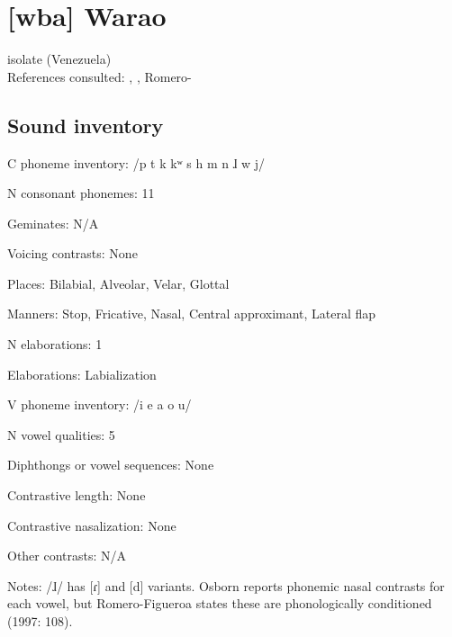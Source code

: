 {\section*{[wba] Warao} %
isolate (Venezuela)\medskip\\
References consulted: \citet{Arinterol2000}, \citet{Osborn1966}, Romero-\citet{Figeroa1997}

\subsection*{Sound inventory}
\begin{appendixdesc}

\item[C phoneme inventory:] /p t k kʷ s h m n ɺ w j/

\item[N consonant phonemes:] 11

\item[Geminates:] N/A

\item[Voicing contrasts:] None

\item[Places:] Bilabial, Alveolar, Velar, Glottal

\item[Manners:] Stop, Fricative, Nasal, Central approximant, Lateral flap

\item[N elaborations:] 1

\item[Elaborations:] Labialization

\item[V phoneme inventory:] /i e a o u/

\item[N vowel qualities:] 5

\item[Diphthongs or vowel sequences:] None

\item[Contrastive length:] None

\item[Contrastive nasalization:] None

\item[Other contrasts:] N/A

\item[Notes:] /ɺ/ has [ɾ] and [d] variants. Osborn reports phonemic nasal contrasts for each vowel, but Romero-Figueroa states these are phonologically conditioned (1997: 108).
\end{appendixdesc}
}
